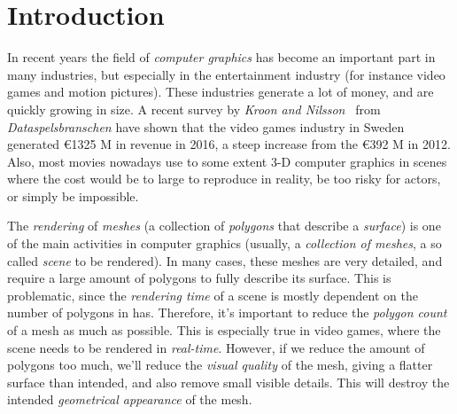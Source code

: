 

\chapter{Introduction}
\label{cha:introduction}

In recent years the field of \emph{computer graphics} has become an important part in many industries, but especially in the entertainment industry (for instance video games and motion pictures). These industries generate a lot of money, and are quickly growing in size. A recent survey by \emph{Kroon and Nilsson}~\cite{kroon2017game} from \emph{Dataspelsbranschen} have shown that the video games industry in Sweden generated \euro 1325 M in revenue in 2016, a steep increase from the \euro 392 M in 2012. Also, most movies nowadays use to some extent 3-D computer graphics in scenes where the cost would be to large to reproduce in reality, be too risky for actors, or simply be impossible.

The \emph{rendering} of \emph{meshes} (a collection of \emph{polygons} that describe a \emph{surface}) is one of the main activities in computer graphics (usually, a \emph{collection of meshes}, a so called \emph{scene} to be rendered). In many cases, these meshes are very detailed, and require a large amount of polygons to fully describe its surface. This is problematic, since the \emph{rendering time} of a scene is mostly dependent on the number of polygons in has. Therefore, it's important to reduce the \emph{polygon count} of a mesh as much as possible. This is especially true in video games, where the scene needs to be rendered in \emph{real-time}. However, if we reduce the amount of polygons too much, we'll reduce the \emph{visual quality} of the mesh, giving a flatter surface than intended, and also remove small visible details. This will destroy the intended \emph{geometrical appearance} of the mesh.

